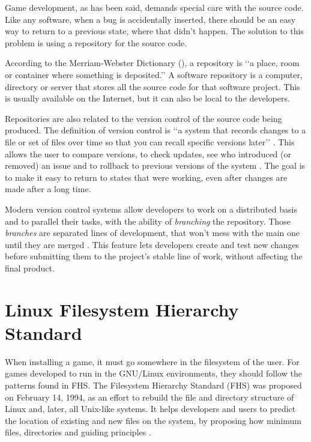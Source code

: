 Game development, as has been said, demands special care with the source code. Like any software, when a bug is accidentally inserted, there should be an easy way to return to a previous state, where that didn't happen. The solution to this problem is using a repository for the source code.

According to the Merriam-Webster Dictionary (\citeyear{webster2017repository}), a repository is \lq\lq a place, room or container where something is deposited.\rq\rq{} A software repository is a computer, directory or server that stores all the source code for that software project. This is usually available on the Internet, but it can also be local to the developers.

Repositories are also related to the version control of the source code being produced. The definition of version control is \lq\lq a system that records changes to a file or set of files over time so that you can recall specific versions later\rq\rq{} \cite{loeliger2012version}. This allows the user to compare versions, to check updates, see who introduced (or removed) an issue and to rollback to previous versions of the system \cite{chacon2014pro}. The goal is to make it easy to return to states that were working, even after changes are made after a long time.

Modern version control systems allow developers to work on a distributed basis and to parallel their tasks, with the ability of \textit{branching} the repository. Those \textit{branches} are separated lines of development, that won't mess with the main one until they are merged \cite{westby2015git}. This feature lets developers create and test new changes before submitting them to the project's stable line of work, without affecting the final product.

\section{Linux Filesystem Hierarchy Standard}
\label {sec:fhs}

When installing a game, it must go somewhere in the filesystem of the user. For games developed to run in the GNU/Linux environments, they should follow the patterns found in FHS. The Filesystem Hierarchy Standard (FHS) was proposed on February 14, 1994, as an effort to rebuild the file and directory structure of Linux and, later, all Unix-like systems. It helps developers and users to predict the location of existing and new files on the system, by proposing how minimum files, directories and guiding principles \cite{bandel2001special}.

